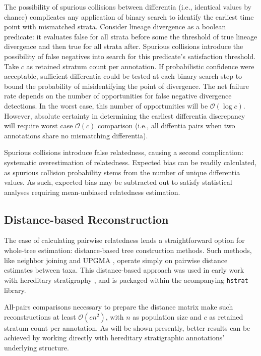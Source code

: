 The possibility of spurious collisions between differentia (i.e., identical values by chance) complicates any application of binary search to identify the earliest time point with mismatched strata.
Consider lineage divergence as a boolean predicate: it evaluates false for all strata before some the threshold of true lineage divergence and then true for all strata after.
Spurious collisions introduce the possibility of false negatives into search for this predicate's satisfaction threshold.
Take $c$ as retained stratum count per annotation.
If probabilistic confidence were acceptable, sufficient differentia could be tested at each binary search step to bound the probability of misidentifying the point of divergence.
The net failure rate depends on the number of opportunities for false negative divergence detections.
In the worst case, this number of opportunities will be $\mathcal{O}(\log c)$.
However, absolute certainty in determining the earliest differentia discrepancy will require worst case $\mathcal{O}(c)$ comparison (i.e., all diffentia pairs when two annotations share no mismatching differentia).

Spurious collisions introduce false relatedness, causing a second complication: systematic overestimation of relatedness.
Expected bias can be readily calculated, as spurious collision probability stems from the number of unique differentia values.
As such, expected bias may be subtracted out to satisfy statistical analyses requiring mean-unbiased relatedness estimation.

\subsection{Distance-based Reconstruction}
\label{sec:distance-based-reconstruction}

The ease of calculating pairwise relatedness lends a straightforward option for whole-tree estimation: distance-based tree construction methods.
Such methods, like neighbor joining and UPGMA \citep{peng2007distance}, operate simply on pairwise distance estimates between taxa.
This distance-based approach was used in early work with hereditary stratigraphy \citep{moreno2022hereditary}, and is packaged within the acompanying \texttt{hstrat} library.

All-pairs comparisons necessary to prepare the distance matrix make such reconstructions at least $\mathcal{O}(c n^2)$, with $n$ as population size and $c$ as retained stratum count per annotation.
As will be shown presently, better results can be achieved by working directly with hereditary stratigraphic annotations' underlying structure.

